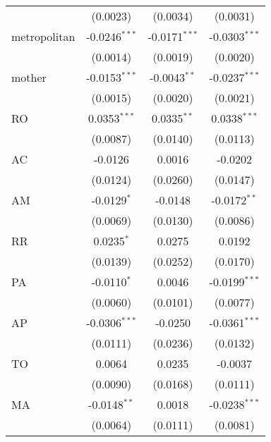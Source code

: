 \begin{tabular}{lccc}
                   & (0.0023)                & (0.0034)                & (0.0031)\\   
   metropolitan    & -0.0246$^{***}$         & -0.0171$^{***}$         & -0.0303$^{***}$\\   
                   & (0.0014)                & (0.0019)                & (0.0020)\\   
   mother          & -0.0153$^{***}$         & -0.0043$^{**}$          & -0.0237$^{***}$\\   
                   & (0.0015)                & (0.0020)                & (0.0021)\\   
   RO              & 0.0353$^{***}$          & 0.0335$^{**}$           & 0.0338$^{***}$\\   
                   & (0.0087)                & (0.0140)                & (0.0113)\\   
   AC              & -0.0126                 & 0.0016                  & -0.0202\\   
                   & (0.0124)                & (0.0260)                & (0.0147)\\   
   AM              & -0.0129$^{*}$           & -0.0148                 & -0.0172$^{**}$\\   
                   & (0.0069)                & (0.0130)                & (0.0086)\\   
   RR              & 0.0235$^{*}$            & 0.0275                  & 0.0192\\   
                   & (0.0139)                & (0.0252)                & (0.0170)\\   
   PA              & -0.0110$^{*}$           & 0.0046                  & -0.0199$^{***}$\\   
                   & (0.0060)                & (0.0101)                & (0.0077)\\   
   AP              & -0.0306$^{***}$         & -0.0250                 & -0.0361$^{***}$\\   
                   & (0.0111)                & (0.0236)                & (0.0132)\\   
   TO              & 0.0064                  & 0.0235                  & -0.0037\\   
                   & (0.0090)                & (0.0168)                & (0.0111)\\   
   MA              & -0.0148$^{**}$          & 0.0018                  & -0.0238$^{***}$\\   
                   & (0.0064)                & (0.0111)                & (0.0081)\\   

\end{tabular}
